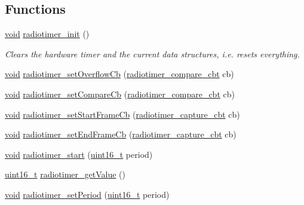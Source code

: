 \subsection*{Functions}
\begin{DoxyCompactItemize}
\item 
\hyperlink{usb__devapi_8h_afabf60e7f57651d6d595a02c75f07cd0}{void} \hyperlink{group__radiotimer_ga9a5ab332f81d5e2a74143ad62ef6a2f7}{radiotimer\+\_\+init} ()
\begin{DoxyCompactList}\small\item\em Clears the hardware timer and the current data structures, i.\+e. resets everything. \end{DoxyCompactList}\item 
\hyperlink{usb__devapi_8h_afabf60e7f57651d6d595a02c75f07cd0}{void} \hyperlink{group__radiotimer_gab892e556a83f22551ff4e4551bd488f7}{radiotimer\+\_\+set\+Overflow\+Cb} (\hyperlink{group__radiotimer_ga62b602325e65023c91b784f20cd2d6bc}{radiotimer\+\_\+compare\+\_\+cbt} cb)
\item 
\hyperlink{usb__devapi_8h_afabf60e7f57651d6d595a02c75f07cd0}{void} \hyperlink{group__radiotimer_gaf4d7c5df5b6c28462c5104df496ae584}{radiotimer\+\_\+set\+Compare\+Cb} (\hyperlink{group__radiotimer_ga62b602325e65023c91b784f20cd2d6bc}{radiotimer\+\_\+compare\+\_\+cbt} cb)
\item 
\hyperlink{usb__devapi_8h_afabf60e7f57651d6d595a02c75f07cd0}{void} \hyperlink{group__radiotimer_gad6bae4a356aa6856a48dd247eea43f84}{radiotimer\+\_\+set\+Start\+Frame\+Cb} (\hyperlink{group__radiotimer_gac7da641d0774aa21bfabefd560e42acf}{radiotimer\+\_\+capture\+\_\+cbt} cb)
\item 
\hyperlink{usb__devapi_8h_afabf60e7f57651d6d595a02c75f07cd0}{void} \hyperlink{group__radiotimer_ga54531cf0f173f07f760d24aeacbc6fe3}{radiotimer\+\_\+set\+End\+Frame\+Cb} (\hyperlink{group__radiotimer_gac7da641d0774aa21bfabefd560e42acf}{radiotimer\+\_\+capture\+\_\+cbt} cb)
\item 
\hyperlink{usb__devapi_8h_afabf60e7f57651d6d595a02c75f07cd0}{void} \hyperlink{iot-lab___m3_2radiotimer_8c_a3dda7b06fc7986db2f835ad5399be228}{radiotimer\+\_\+start} (\hyperlink{_p_e___types_8h_a1f1825b69244eb3ad2c7165ddc99c956}{uint16\+\_\+t} period)
\item 
\hyperlink{_p_e___types_8h_a1f1825b69244eb3ad2c7165ddc99c956}{uint16\+\_\+t} \hyperlink{group__radiotimer_ga763b0da72c3bbf926f5a74283de1003c}{radiotimer\+\_\+get\+Value} ()
\item 
\hyperlink{usb__devapi_8h_afabf60e7f57651d6d595a02c75f07cd0}{void} \hyperlink{iot-lab___m3_2radiotimer_8c_a3e0cb6aae48e0b636c661446f83242d9}{radiotimer\+\_\+set\+Period} (\hyperlink{_p_e___types_8h_a1f1825b69244eb3ad2c7165ddc99c956}{uint16\+\_\+t} period)

\end{DoxyCompactItemize}
